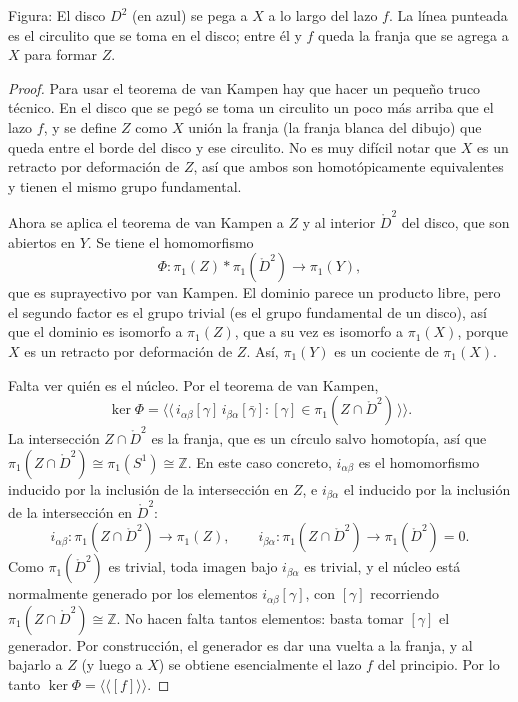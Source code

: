 \documentclass[11pt]{article}
\begin{document}
\noindent Figura: El disco $D^2$ (en azul) se pega a $X$ a lo largo del lazo $f$. La línea punteada es el circulito que se toma en el disco; entre él y $f$ queda la franja que se agrega a $X$ para formar $Z$.

\begin{proof}
Para usar el teorema de van Kampen hay que hacer un pequeño truco técnico. En el disco que se pegó se toma un circulito un poco más arriba que el lazo $f$, y se define $Z$ como $X$ unión la franja (la \guillemotleft{}franja blanca\guillemotright{} del dibujo) que queda entre el borde del disco y ese circulito. No es muy difícil notar que $X$ es un retracto por deformación de $Z$, así que ambos son homotópicamente equivalentes y tienen el mismo grupo fundamental.

Ahora se aplica el teorema de van Kampen a $Z$ y al interior $\mathring{D}^2$ del disco, que son abiertos en $Y$. Se tiene el homomorfismo
\[
  \Phi\colon\pi_1(Z)*\pi_1(\mathring{D}^2)\to\pi_1(Y),
\]
que es suprayectivo por van Kampen. El dominio parece un producto libre, pero el segundo factor es el grupo trivial (es el grupo fundamental de un disco), así que el dominio es isomorfo a $\pi_1(Z)$, que a su vez es isomorfo a $\pi_1(X)$, porque $X$ es un retracto por deformación de $Z$. Así, $\pi_1(Y)$ es un cociente de $\pi_1(X)$.

Falta ver quién es el núcleo. Por el teorema de van Kampen,
\[
  \ker\Phi=\bigl\langle\!\bigl\langle\, i_{\alpha\beta}[\gamma]\,i_{\beta\alpha}[\bar\gamma] : [\gamma]\in\pi_1(Z\cap\mathring{D}^2)\,\bigr\rangle\!\bigr\rangle.
\]
La intersección $Z\cap\mathring{D}^2$ es la franja, que es un círculo salvo homotopía, así que $\pi_1(Z\cap\mathring{D}^2)\cong\pi_1(S^1)\cong\mathbb{Z}$. En este caso concreto, $i_{\alpha\beta}$ es el homomorfismo inducido por la inclusión de la intersección en $Z$, e $i_{\beta\alpha}$ el inducido por la inclusión de la intersección en $\mathring{D}^2$:
\[
  i_{\alpha\beta}\colon\pi_1(Z\cap\mathring{D}^2)\to\pi_1(Z),\qquad i_{\beta\alpha}\colon\pi_1(Z\cap\mathring{D}^2)\to\pi_1(\mathring{D}^2)=0.
\]
Como $\pi_1(\mathring{D}^2)$ es trivial, toda imagen bajo $i_{\beta\alpha}$ es trivial, y el núcleo está normalmente generado por los elementos $i_{\alpha\beta}[\gamma]$, con $[\gamma]$ recorriendo $\pi_1(Z\cap\mathring{D}^2)\cong\mathbb{Z}$. No hacen falta tantos elementos: basta tomar $[\gamma]$ el generador. Por construcción, el generador es dar una vuelta a la franja, y al bajarlo a $Z$ (y luego a $X$) se obtiene esencialmente el lazo $f$ del principio. Por lo tanto $\ker\Phi=\langle\!\langle[f]\rangle\!\rangle$.
\end{proof}
\end{document}
